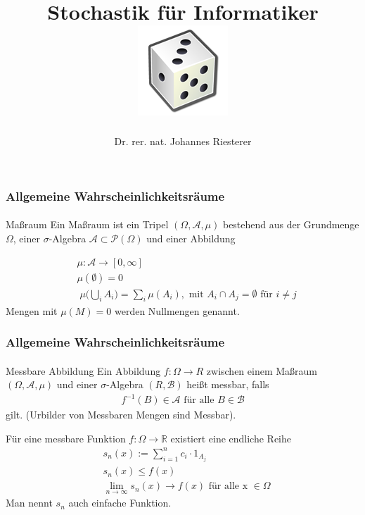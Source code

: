 \documentclass{beamer}
\begin{document}
\title[Stochastik] %
{Stochastik für Informatiker
\\
\includegraphics[scale=0.5]{img/craps}
}
\subtitle{}
\author[Dr. Johannes Riesterer] %
{Dr.  rer. nat. Johannes Riesterer}

\date[KPT 2004] %
{}

\subject{Stochastik}

\frame{\titlepage}

\begin{frame}
    \frametitle{Allgemeine Wahrscheinlichkeitsräume}
\framesubtitle{}
\begin{block}{Maßraum}
Ein Maßraum ist ein Tripel $(\Omega, \mathcal{A}, \mu)$ bestehend aus der Grundmenge $\Omega$, einer $\sigma$-Algebra $\mathcal{A} \subset  \mathcal{P}(\Omega)$ und einer Abbildung

\begin{align*}
& \mu : \mathcal{A} \to [0,\infty] \\
& \mu (\emptyset)  = 0 \\
 & \;  \mu \biggl(  \bigcup_i A_i  \biggr) = \sum_i \mu(A_i), \text{ mit } A_i \cap A_j = \emptyset \text{ für } i \neq j
\end{align*}
Mengen mit $\mu(M) = 0$ werden Nullmengen genannt.
\end{block}
 \end{frame}


\begin{frame}
    \frametitle{Allgemeine Wahrscheinlichkeitsräume}
\framesubtitle{}
\begin{block}{Messbare  Abbildung}
Ein Abbildung  $f : \Omega \to R$ zwischen einem Maßraum  $(\Omega, \mathcal{A}, \mu)$  und einer $\sigma$-Algebra $(R,  \mathcal{B} )$ heißt messbar, falls 
\begin{align*}
f^{-1}(B) \in \mathcal{A} \text{ für alle } B \in  \mathcal{B}
\end{align*}
gilt. (Urbilder von Messbaren Mengen sind Messbar).

Für eine messbare Funktion  $f: \Omega \to \mathbb{R}$ existiert eine endliche Reihe 
\begin{align*}
& s_n(x) := \sum_{i = 1}^{n} c_i \cdot 1_{A_j} \\
 & s_n(x) \leq f(x) \\
 & \lim_{n \to \infty}  s_n(x) \to f(x)  \text{ für alle x  } \in \Omega
\end{align*}
Man nennt $s_n$ auch einfache Funktion. \end{block}
 \end{frame}
\end{document}
